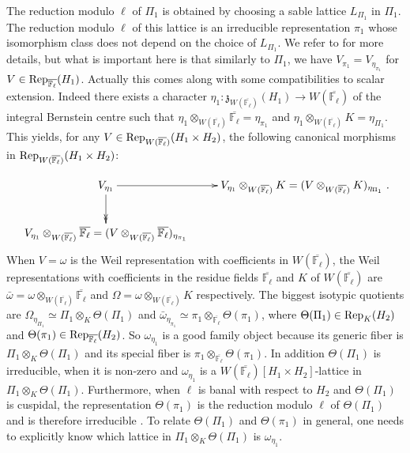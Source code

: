 \documentclass[11pt]{article}
\theoremstyle{plain}
\theoremstyle{definition}
\theoremstyle{plain}
\theoremstyle{definition}
\theoremstyle{plain}
\begin{document}
The reduction modulo $\ell$ of $\Pi_1$ is obtained by choosing a sable lattice $L_{\Pi_1}$ in $\Pi_1$. The reduction modulo $\ell$ of this lattice is an irreducible representation $\pi_1$ whose isomorphism class does not depend on the choice of $L_{\Pi_1}$. We refer to \cite[Sec. 5.3]{trias_theta1} for more details, but what is important here is that similarly to $\Pi_1$, we have $V_{\pi_1} = V_{\eta_{\pi_1}}$ for $V \in \textup{Rep}_{\overline{\mathbb{F}_\ell}}(H_1)$. Actually this comes along with some compatibilities to scalar extension. Indeed there exists a character $\eta_1 : \mathfrak{z}_{W(\overline{\mathbb{F}_\ell})}(H_1) \to W(\overline{\mathbb{F}_\ell})$ of the integral Bernstein centre such that $\eta_1 \otimes_{W(\overline{\mathbb{F}_\ell})} \overline{\mathbb{F}_\ell} = \eta_{\pi_1}$ and $\eta_1 \otimes_{W(\overline{\mathbb{F}_\ell})} K = \eta_{\Pi_1}$. This yields, for any $V \in \textup{Rep}_{W(\overline{\mathbb{F}_\ell})}(H_1 \times H_2)$, the following canonical morphisms in $\textup{Rep}_{W(\overline{\mathbb{F}_\ell})}(H_1 \times H_2)$:

$$\xymatrix{
V_{\eta_1} \ar@{->>}[d] \ar[r] &  V_{\eta_1} \otimes_{W(\overline{\mathbb{F}_\ell})} K = (V \otimes_{W(\overline{\mathbb{F}_\ell})} K)_{\eta_{\Pi_1}} \\
V_{\eta_1}  \otimes_{W(\overline{\mathbb{F}_\ell})} \overline{\mathbb{F}_\ell} = (V \otimes_{W(\overline{\mathbb{F}_\ell})} \overline{\mathbb{F}_\ell})_{\eta_{\pi_1}} &  
}.$$
When $V=\omega$ is the Weil representation with coefficients in $W(\overline{\mathbb{F}_\ell})$, the Weil representations with coefficients in the residue fields $\overline{\mathbb{F}_\ell}$ and $K$ of $W(\overline{\mathbb{F}_\ell})$ are $\bar{\omega} = \omega \otimes_{W(\overline{\mathbb{F}_\ell})} \overline{\mathbb{F}_\ell}$ and $\Omega = \omega \otimes_{W(\overline{\mathbb{F}_\ell})} K$ respectively. The biggest isotypic quotients are $\Omega_{\eta_{\Pi_1}} \simeq \Pi_1 \otimes_K \Theta (\Pi_1)$ and $\bar{\omega}_{\eta_{\pi_1}} \simeq \pi_1 \otimes_{\overline{\mathbb{F}_\ell}} \Theta(\pi_1)$, where $\Theta(\Pi_1) \in \textup{Rep}_K(H_2)$ and $\Theta(\pi_1) \in \textup{Rep}_{\overline{\mathbb{F}_\ell}}(H_2)$. So $\omega_{\eta_1}$  is a good family object because its generic fiber is $\Pi_1 \otimes_K \Theta(\Pi_1)$ and its special fiber is $\pi_1 \otimes_{\overline{\mathbb{F}_\ell}} \Theta(\pi_1)$. In addition $\Theta(\Pi_1)$ is irreducible, when it is non-zero and $\omega_{\eta_1}$ is a $W(\overline{\mathbb{F}_\ell})[H_1 \times H_2]$-lattice in $\Pi_1 \otimes_K \Theta(\Pi_1)$. Furthermore, when $\ell$ is banal with respect to $H_2$ and $\Theta(\Pi_1)$ is cuspidal, the representation $\Theta(\pi_1)$ is the reduction modulo $\ell$ of $\Theta(\Pi_1)$ and is therefore irreducible \cite[Th. 5.17]{trias_theta1}. To relate $\Theta(\Pi_1)$ and $\Theta(\pi_1)$ in general, one needs to explicitly know which lattice in $\Pi_1 \otimes_K \Theta(\Pi_1)$ is $\omega_{\eta_1}$.
\end{document}
